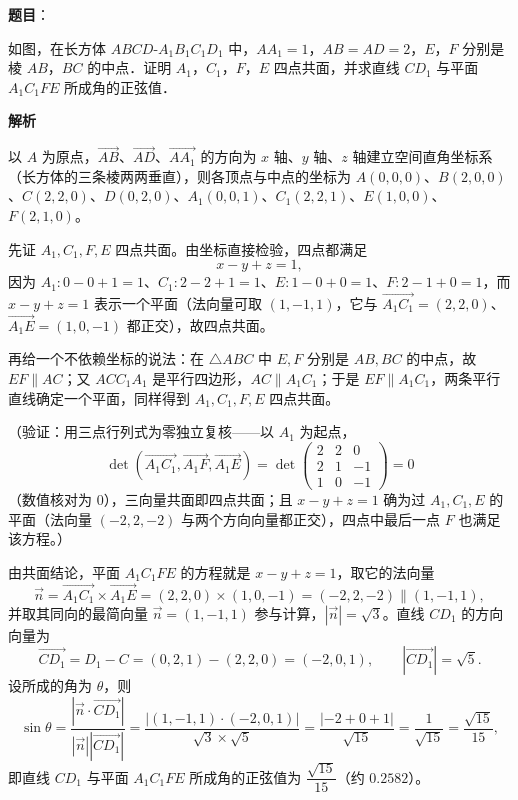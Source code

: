 \begin{answer}

\textbf{题目}：

如图，在长方体 \(ABCD\text{-}A_{1}B_{1}C_{1}D_{1}\) 中，\(AA_{1}=1\)，\(AB=AD=2\)，\(E\)，\(F\) 分别是棱 \(AB\)，\(BC\) 的中点．证明 \(A_{1}\)，\(C_{1}\)，\(F\)，\(E\) 四点共面，并求直线 \(CD_{1}\) 与平面 \(A_{1}C_{1}FE\) 所成角的正弦值．
\nopagebreak[4]
\begin{center}\end{center}
\nopagebreak[4]
\textbf{解析}

以 \(A\) 为原点，\(\overrightarrow{AB}\)、\(\overrightarrow{AD}\)、\(\overrightarrow{AA_{1}}\) 的方向为 \(x\) 轴、\(y\) 轴、\(z\) 轴建立空间直角坐标系（长方体的三条棱两两垂直），则各顶点与中点的坐标为 \(A(0,0,0)\)、\(B(2,0,0)\)、\(C(2,2,0)\)、\(D(0,2,0)\)、\(A_{1}(0,0,1)\)、\(C_{1}(2,2,1)\)、\(E(1,0,0)\)、\(F(2,1,0)\)。

先证 \(A_{1},C_{1},F,E\) 四点共面。由坐标直接检验，四点都满足
\nopagebreak[4]
\[
x-y+z=1,
\]
因为 \(A_{1}:0-0+1=1\)、\(C_{1}:2-2+1=1\)、\(E:1-0+0=1\)、\(F:2-1+0=1\)，而 \(x-y+z=1\) 表示一个平面（法向量可取 \((1,-1,1)\)，它与 \(\overrightarrow{A_{1}C_{1}}=(2,2,0)\)、\(\overrightarrow{A_{1}E}=(1,0,-1)\) 都正交），故四点共面。

再给一个不依赖坐标的说法：在 \(\triangle ABC\) 中 \(E,F\) 分别是 \(AB,BC\) 的中点，故 \(EF\parallel AC\)；又 \(ACC_{1}A_{1}\) 是平行四边形，\(AC\parallel A_{1}C_{1}\)；于是 \(EF\parallel A_{1}C_{1}\)，两条平行直线确定一个平面，同样得到 \(A_{1},C_{1},F,E\) 四点共面。

（验证：用三点行列式为零独立复核——以 \(A_{1}\) 为起点，
\nopagebreak[4]
\[
\det\left(\overrightarrow{A_{1}C_{1}},\overrightarrow{A_{1}F},\overrightarrow{A_{1}E}\right)=\det\begin{pmatrix}2&2&0\\ 2&1&-1\\ 1&0&-1\end{pmatrix}=0
\]
（数值核对为 \(0\)），三向量共面即四点共面；且 \(x-y+z=1\) 确为过 \(A_{1},C_{1},E\) 的平面（法向量 \((-2,2,-2)\) 与两个方向向量都正交），四点中最后一点 \(F\) 也满足该方程。）

由共面结论，平面 \(A_{1}C_{1}FE\) 的方程就是 \(x-y+z=1\)，取它的法向量
\nopagebreak[4]
\[
\vec{n}=\overrightarrow{A_{1}C_{1}}\times\overrightarrow{A_{1}E}=(2,2,0)\times(1,0,-1)=(-2,2,-2)\parallel(1,-1,1),
\]
并取其同向的最简向量 \(\vec{n}=(1,-1,1)\) 参与计算，\(\left|\vec{n}\right|=\sqrt{3}\)。直线 \(CD_{1}\) 的方向向量为
\nopagebreak[4]
\[
\overrightarrow{CD_{1}}=D_{1}-C=(0,2,1)-(2,2,0)=(-2,0,1),\qquad\left|\overrightarrow{CD_{1}}\right|=\sqrt{5}.
\]
设所成的角为 \(\theta\)，则
\nopagebreak[4]
\[
\sin\theta=\frac{\left|\vec{n}\cdot\overrightarrow{CD_{1}}\right|}{\left|\vec{n}\right|\left|\overrightarrow{CD_{1}}\right|}=\frac{\left|(1,-1,1)\cdot(-2,0,1)\right|}{\sqrt{3}\times\sqrt{5}}=\frac{\left|-2+0+1\right|}{\sqrt{15}}=\frac{1}{\sqrt{15}}=\frac{\sqrt{15}}{15},
\]
即直线 \(CD_{1}\) 与平面 \(A_{1}C_{1}FE\) 所成角的正弦值为 \(\dfrac{\sqrt{15}}{15}\)（约 \(0.2582\)）。


\end{answer}
